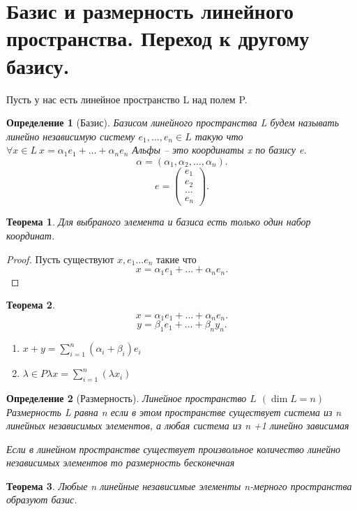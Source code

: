 \documentclass{scrartcl}
\newtheorem{theorem}{Теорема}
\newtheorem{definition}{Определение}
\begin{document}
\section{Базис и размерность линейного пространства. Переход к другому базису.}
Пусть у нас есть линейное пространство L над полем P.
\begin{definition}[Базис]
    Базисом линейного пространства L будем называть линейно независимую систему 
     $e_1,\dots,e_{n} \in L$ такую что $\forall  x\in L ~ x = \alpha_1 e_1 + \dots + \alpha_{n}e_{n}$ Альфы -- это координаты x по базису e.
     \[
     \alpha = (\alpha_1,\alpha_2,\dots,\alpha_{n})
     .\] 
     \[
     e = \begin{pmatrix} 
     e_1\\
     e_2\\
     \dots\\
     e_{n}
     \end{pmatrix} 
     .\] 
\end{definition}
\begin{theorem}
   Для выбраного элемента и базиса есть только один набор координат.
\end{theorem}
\begin{proof}
   Пусть существуют $x, e_1 \dots e_{n}$ такие что 
   \[
   x = \alpha_{1} e_{1} + \dots + \alpha_{n} e_{n}
   .\] 
\end{proof}
\begin{theorem}
   \[
   x = \alpha_{1} e_1 + \dots + \alpha_{n} e_{n}
   .\]  
   \[
   y = \beta_{1} e_1 + \dots + \beta_{n}y_{n}
   .\] 
   \begin{enumerate}
       \item $x + y = \sum_{i=1}^{n} (\alpha_{i} + \beta_{i})e_{i}$
      \item $\lambda \in P \lambda x = \sum_{i = 1}^{n} (\lambda x_{i})$
   \end{enumerate}
\end{theorem}
\begin{definition}[Размерность]
    Линейное пространство $L$  $(\dim{L} = n)$ Размерность L равна n если в этом пространстве существует система из n линейных независимых элементов, а любая система из n +1 линейно зависимая

    Если в линейном пространстве существует произвольное количество линейно независимых элементов то размерность бесконечная
\end{definition}
\begin{theorem}
    Любые n линейные независимые элементы n-мерного пространства образуют базис.
\end{theorem}
\end{document}
